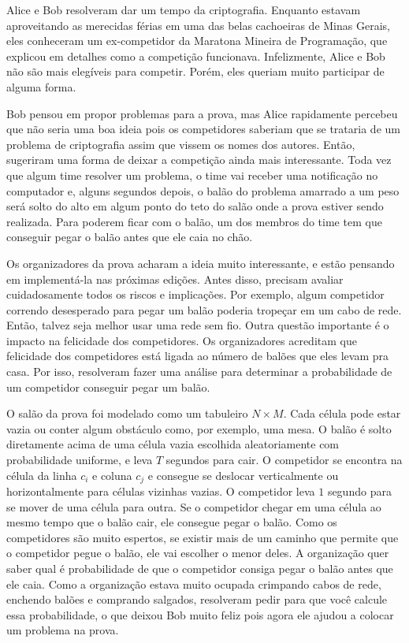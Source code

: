 Alice e Bob resolveram dar um tempo da criptografia.
Enquanto estavam aproveitando as merecidas férias em uma das belas cachoeiras de Minas Gerais, eles
conheceram um ex-competidor da Maratona Mineira de Programação, que explicou em detalhes como a competição funcionava.
Infelizmente, Alice e Bob não são mais elegíveis para competir. Porém, eles queriam muito participar de alguma forma.

Bob pensou em propor problemas para a prova, mas Alice rapidamente percebeu que não seria uma boa ideia pois os competidores
saberiam que se trataria de um problema de criptografia assim que vissem os nomes dos autores. Então, sugeriram uma forma
de deixar a competição ainda mais interessante. Toda vez que algum time resolver um problema, o time vai receber uma notificação
no computador e, alguns segundos depois, o balão do problema amarrado a um peso será solto do alto em algum ponto do teto do salão
onde a prova estiver sendo realizada. Para poderem ficar com o balão, um dos membros do time tem que conseguir pegar o balão antes
que ele caia no chão. 

Os organizadores da prova acharam a ideia muito interessante, e estão pensando em implementá-la nas próximas edições.
Antes disso, precisam avaliar cuidadosamente todos os riscos e implicações. Por exemplo, algum competidor correndo desesperado
para pegar um balão poderia tropeçar em um cabo de rede. Então, talvez seja melhor usar uma rede sem fio. Outra questão importante
é o impacto na felicidade dos competidores. Os organizadores acreditam que felicidade dos competidores está ligada ao número de
balões que eles levam pra casa. Por isso, resolveram fazer uma análise para determinar a probabilidade de um competidor conseguir
pegar um balão.

O salão da prova foi modelado como um tabuleiro $N \times M$. Cada célula pode estar vazia ou conter algum obstáculo como, por exemplo, uma mesa.
O balão é solto diretamente acima de uma célula vazia escolhida aleatoriamente com probabilidade uniforme, e leva $T$ segundos para cair. 
O competidor se encontra na célula da linha $c_i$ e coluna $c_j$ e consegue se deslocar verticalmente ou horizontalmente para células vizinhas
vazias. O competidor leva $1$ segundo para se mover de uma célula para outra. 
Se o competidor chegar em uma célula ao mesmo tempo que o balão cair, ele consegue pegar o balão.
Como os competidores são muito espertos, se existir mais de um caminho que permite que o competidor pegue o balão, ele vai escolher o menor deles.
A organização quer saber qual é probabilidade de que o competidor consiga pegar o balão antes que ele caia. Como a
organização estava muito ocupada crimpando cabos de rede, enchendo balões e comprando salgados, resolveram pedir para que você calcule essa probabilidade, o que deixou Bob muito feliz pois agora ele ajudou a colocar um problema na prova.


